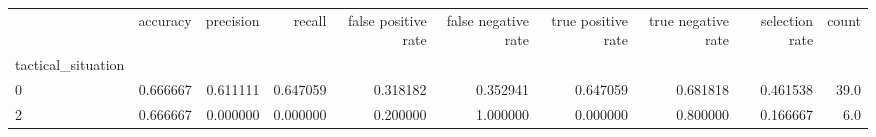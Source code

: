 \begin{tabular}{lrrrrrrrrr}
\toprule
{} &  accuracy &  precision &    recall &  false positive rate &  false negative rate &  true positive rate &  true negative rate &  selection rate &  count \\
tactical\_situation &           &            &           &                      &                      &                     &                     &                 &        \\
\midrule
0                  &  0.666667 &   0.611111 &  0.647059 &             0.318182 &             0.352941 &            0.647059 &            0.681818 &        0.461538 &   39.0 \\
2                  &  0.666667 &   0.000000 &  0.000000 &             0.200000 &             1.000000 &            0.000000 &            0.800000 &        0.166667 &    6.0 \\
\bottomrule
\end{tabular}
